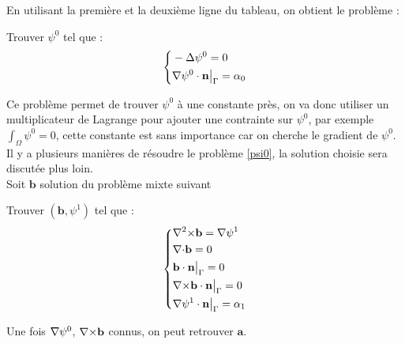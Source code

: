 En utilisant la première et la deuxième ligne du tableau, on obtient le problème :
\begin{pb}\label{psi0}
Trouver $\psi^0$ tel que :
\begin{equation*}
\left\{\begin{aligned}
&-{\Delta}\psi^0 = 0\\
&{\nabla}\psi^0\cdot \mathbf{n}{\big\rvert_{\Gamma}}=\alpha_0
\end{aligned}\right.
\end{equation*}\end{pb}
Ce problème permet de trouver $\psi^0$ à une constante près, on va donc utiliser un multiplicateur de Lagrange pour ajouter une contrainte sur $\psi^0$, par exemple $\int_\Omega \psi^0 = 0$, cette constante est sans importance car on cherche le gradient de $\psi^0$.\\
Il y a plusieurs manières de résoudre le problème \ref{psi0}, la solution choisie sera discutée plus loin.\\

Soit $\mathbf{b}$ solution du problème mixte suivant
\begin{pb}\label{curlb}
Trouver $(\mathbf{b},\psi^1)$ tel que :
\begin{equation*}
\left\{\begin{aligned}
&{\nabla^2\times} \mathbf{b} = {\nabla}\psi^1\\
&{\nabla\cdot} \mathbf{b} = 0\\
&\mathbf{b}\cdot \mathbf{n}{\big\rvert_{\Gamma}} = 0\\
&{\nabla\times} \mathbf{b}\cdot \mathbf{n}{\big\rvert_{\Gamma}} = 0\\
&{\nabla}\psi^1\cdot \mathbf{n}{\big\rvert_{\Gamma}} = \alpha_1
\end{aligned}\right.
\end{equation*}\end{pb}


Une fois ${\nabla}\psi^0$, ${\nabla\times} \mathbf{b}$ connus, on peut retrouver $\mathbf{a}$.\\

